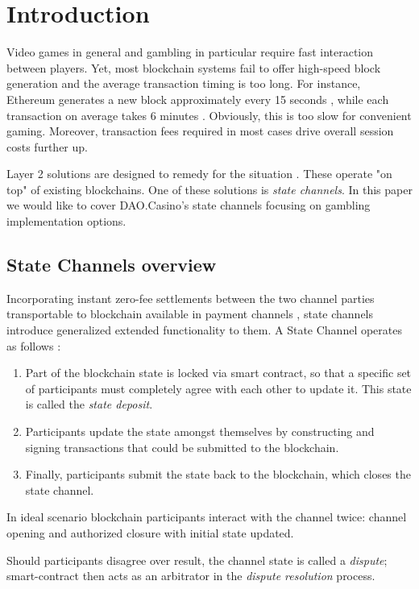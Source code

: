 \section{Introduction}
	Video games in general and gambling in particular require fast interaction between players. Yet, most blockchain systems fail to offer high-speed block generation and the average transaction timing is too long. For instance, Ethereum generates a new block approximately every 15 seconds \cite{bib2}, while each transaction on average takes 6 minutes \cite{bib3}. Obviously, this is too slow for convenient gaming. Moreover, transaction fees required in most cases drive overall session costs further up.


	Layer 2 solutions are designed to remedy for the situation \cite{bib4}. These operate "on top" of existing blockchains. One of these solutions is \textit{state channels}. In this paper we would like to cover DAO.Casino's state channels focusing on gambling implementation options.


		\subsection {State Channels overview}
	Incorporating instant zero-fee settlements between the two channel parties transportable to blockchain available in payment channels \cite{bib11}, state channels introduce generalized extended functionality to them. 
	A State Channel operates as follows \cite{bib5}:
	\begin{enumerate}
		\item Part of the blockchain state is locked via smart contract, so that a specific set of participants must completely agree with each other to update it. This state is called the \textit {state deposit}.
		\item Participants update the state amongst themselves by constructing and signing transactions that could be submitted to the blockchain.
		\item Finally, participants submit the state back to the blockchain, which closes the state channel.
	\end{enumerate}

	In ideal scenario blockchain participants interact with the channel twice: channel opening and authorized closure with initial state updated.

	Should participants disagree over result, the channel state is called a \textit {dispute}; smart-contract then acts as an arbitrator in the \textit {dispute resolution} process.

